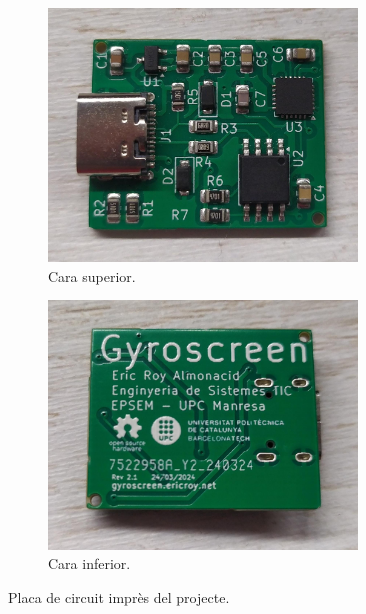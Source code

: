 \begin{figure}[ht]
    \centering
    \begin{subfigure}{0.45\textwidth}
        \centering
        \includegraphics[width=0.9\textwidth]{images/device/top.jpeg}
        \caption{Cara superior.}
        \label{fig:printedpcb_top}
    \end{subfigure}
    \begin{subfigure}{0.45\textwidth}
        \centering
        \includegraphics[width=0.9\textwidth]{images/device/bottom.jpeg}
        \caption{Cara inferior.}
        \label{fig:printedpcb_bottom}
    \end{subfigure}
    \caption{Placa de circuit imprès del projecte.}
    \label{fig:printedpcb}
\end{figure}

